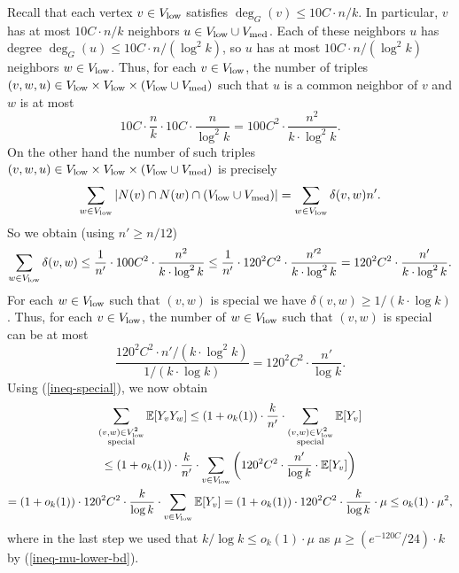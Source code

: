 Recall that each vertex $v\in V_{\textnormal{low}}$ satisfies $\deg_G(v)\leq 10C\cdot n/k$. In particular, $v$ has at most $10C\cdot n/k$ neighbors $u\in V_{\textnormal{low}}\cup V_{\textnormal{med}}$. Each of these neighbors $u$ has degree $\deg_G(u)\leq 10C\cdot n/(\log^2 k)$, so $u$ has at most $10C\cdot n/(\log^2 k)$ neighbors $w\in V_{\textnormal{low}}$. Thus, for each $v\in V_{\textnormal{low}}$, the number of triples $(v,w,u)\in V_{\textnormal{low}}\times V_{\textnormal{low}}\times (V_{\textnormal{low}}\cup V_{\textnormal{med}})$ such that $u$ is a common neighbor of $v$ and $w$ is at most
\[10C\cdot \frac{n}{k}\cdot 10C\cdot \frac{n}{\log^2 k}=100C^2\cdot \frac{n^2}{k\cdot \log^2 k}.\]
On the other hand the number of such triples $(v,w,u)\in V_{\textnormal{low}}\times V_{\textnormal{low}}\times (V_{\textnormal{low}}\cup V_{\textnormal{med}})$ is precisely
\[\sum_{w\in V_{\textnormal{low}}}\vert N(v)\cap N(w)\cap (V_{\textnormal{low}}\cup V_{\textnormal{med}})\vert=\sum_{w\in V_{\textnormal{low}}}\delta(v,w)n'.\]
So we obtain (using $n'\geq n/12$)
\[\sum_{w\in V_{\textnormal{low}}}\delta(v,w)\leq \frac{1}{n'}\cdot 100C^2\cdot \frac{n^2}{k\cdot \log^2 k}\leq \frac{1}{n'}\cdot 120^2C^2\cdot \frac{n'^2}{k\cdot \log^2 k} =120^2C^2\cdot \frac{n'}{k\cdot \log^2 k}.\]
For each $w\in V_{\textnormal{low}}$ such that $(v,w)$ is special we have $\delta(v,w)\geq 1/(k\cdot \log k)$. Thus, for each $v\in V_{\textnormal{low}}$, the number of $w\in V_{\textnormal{low}}$ such that $(v,w)$ is special can be at most
\[\frac{120^2C^2\cdot n'/(k\cdot \log^2 k)}{1/(k\cdot \log k)}=120^2C^2\cdot\frac{n'}{\log k}.\]
Using (\ref{ineq-special}), we now obtain
\begin{multline}\label{ineq-special-2}
\sum_{\substack{(v,w)\in V_{\textnormal{low}}^2\\\text{special}}}\mathbb{E}[Y_vY_w]\leq (1+o_k(1))\cdot \frac{k}{n'}\cdot \sum_{\substack{(v,w)\in V_{\textnormal{low}}^2\\\text{special}}}\mathbb{E}[Y_v]\\
\leq (1+o_k(1))\cdot \frac{k}{n'}\cdot \sum_{v\in V_{\textnormal{low}}}\left(120^2C^2\cdot\frac{n'}{\log k}\cdot\mathbb{E}[Y_v]\right)\\
= (1+o_k(1))\cdot 120^2C^2\cdot \frac{k}{\log k}\cdot \sum_{v\in V_{\textnormal{low}}}\mathbb{E}[Y_v] =(1+o_k(1))\cdot 120^2C^2\cdot \frac{k}{\log k}\cdot\mu\leq o_k(1)\cdot \mu^2,
\end{multline}
where in the last step we used that $k/\log k\leq o_k(1)\cdot \mu$ as $\mu\geq (e^{-120C}/24)\cdot k$ by (\ref{ineq-mu-lower-bd}).

